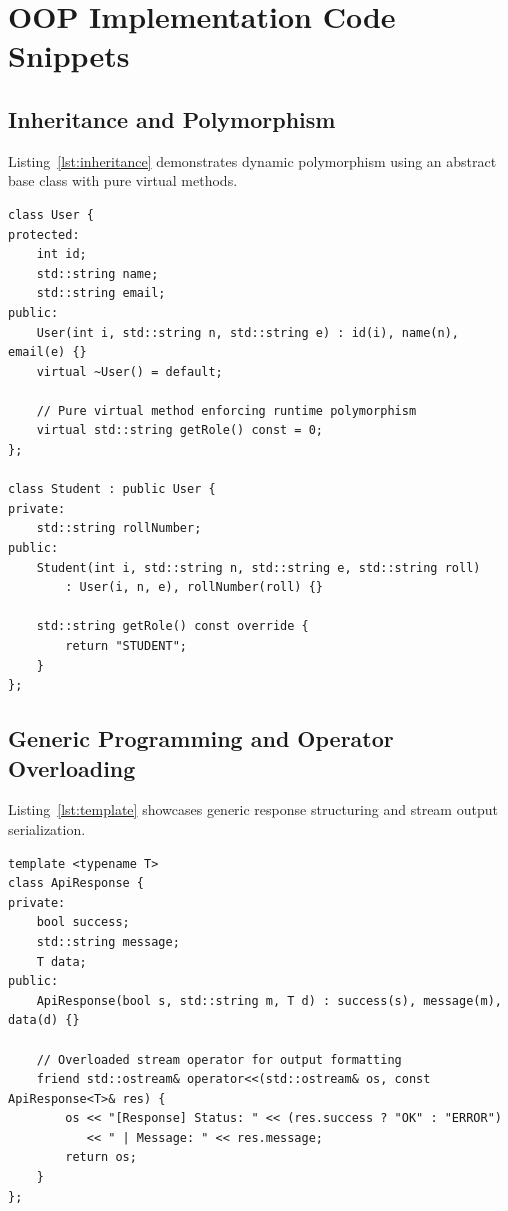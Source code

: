 \documentclass[12pt,a4paper,oneside]{book}
\begin{document}
\section{OOP Implementation Code Snippets}

\subsection{Inheritance and Polymorphism}
Listing~\ref{lst:inheritance} demonstrates dynamic polymorphism using an abstract base class with pure virtual methods.

\begin{lstlisting}[caption={Inheritance Hierarchy for User Roles}, label={lst:inheritance}]
class User {
protected:
    int id;
    std::string name;
    std::string email;
public:
    User(int i, std::string n, std::string e) : id(i), name(n), email(e) {}
    virtual ~User() = default;
    
    // Pure virtual method enforcing runtime polymorphism
    virtual std::string getRole() const = 0; 
};

class Student : public User {
private:
    std::string rollNumber;
public:
    Student(int i, std::string n, std::string e, std::string roll) 
        : User(i, n, e), rollNumber(roll) {}

    std::string getRole() const override {
        return "STUDENT";
    }
};
\end{lstlisting}

\subsection{Generic Programming and Operator Overloading}
Listing~\ref{lst:template} showcases generic response structuring and stream output serialization.

\begin{lstlisting}[caption={Generic ApiResponse Template and Operator Overloading}, label={lst:template}]
template <typename T>
class ApiResponse {
private:
    bool success;
    std::string message;
    T data;
public:
    ApiResponse(bool s, std::string m, T d) : success(s), message(m), data(d) {}

    // Overloaded stream operator for output formatting
    friend std::ostream& operator<<(std::ostream& os, const ApiResponse<T>& res) {
        os << "[Response] Status: " << (res.success ? "OK" : "ERROR")
           << " | Message: " << res.message;
        return os;
    }
};
\end{lstlisting}
\end{document}
